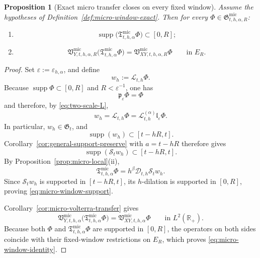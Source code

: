 \documentclass[11pt,a4paper]{amsart}
\theoremstyle{plain}
\newtheorem{proposition}[theorem]{Proposition}
\theoremstyle{definition}
\theoremstyle{remark}
\newcommand{\R}{\mathbb{R}}
\begin{document}
\begin{proposition}[Exact micro transfer closes on every fixed window]
\label{prop:micro-window-exact}
Assume the hypotheses of Definition~\ref{def:micro-window-exact}. Then for every
\(\Phi\in\mathfrak G_{t,h,\alpha,R}^{\mathrm{mic}}\):
\begin{enumerate}[label=(\roman*)]
\item
\begin{equation}\label{eq:micro-window-support}
\operatorname{supp}\bigl(\mathfrak T_{t,h,\alpha}^{\mathrm{mic}}\Phi\bigr)\subset [0,R];
\end{equation}
\item
\begin{equation}\label{eq:micro-window-identity}
\mathfrak V_{Y,t,h,\alpha,R}^{\mathrm{mic}}
\bigl(
\mathfrak T_{t,h,\alpha}^{\mathrm{mic}}\Phi
\bigr)
=
\mathfrak V_{XY,t,h,\alpha,R}^{\mathrm{mic}}\Phi
\qquad\text{in }E_R.
\end{equation}
\end{enumerate}
\end{proposition}

\begin{proof}
Set \(\varepsilon:=\varepsilon_{h,\alpha}\), and define
\[
w_h:=\mathcal L_{t,h}\Phi.
\]
Because \(\operatorname{supp}\Phi\subset [0,R]\) and \(R<\varepsilon^{-1}\), one has
\[
\mathfrak p_{\varepsilon}\Phi=\Phi
\]
and therefore, by \eqref{eq:two-scale-L},
\[
w_h
=
\mathcal L_{t,h}\Phi
=
\mathcal L_{t,h}^{(\alpha)}\mathfrak l_{\varepsilon}\Phi.
\]
In particular, \(w_h\in\mathfrak G_t\), and
\[
\operatorname{supp}(w_h)\subset [t-hR,t].
\]
Corollary~\ref{cor:general-support-preserve} with \(a=t-hR\) therefore gives
\[
\operatorname{supp}(\mathcal S_t w_h)\subset [t-hR,t].
\]
By Proposition~\ref{prop:micro-local}(ii),
\[
\mathfrak T_{t,h,\alpha}^{\mathrm{mic}}\Phi
=
h^\beta \mathcal D_{t,h}\mathcal S_t w_h.
\]
Since \(\mathcal S_t w_h\) is supported in \([t-hR,t]\), its \(h\)-dilation is supported in
\([0,R]\), proving \eqref{eq:micro-window-support}.

Corollary~\ref{cor:micro-volterra-transfer} gives
\[
\mathfrak V_{Y,t,h,\alpha}^{\mathrm{mic}}
\bigl(
\mathfrak T_{t,h,\alpha}^{\mathrm{mic}}\Phi
\bigr)
=
\mathfrak V_{XY,t,h,\alpha}^{\mathrm{mic}}\Phi
\qquad\text{in }L^2(\R_+).
\]
Because both \(\Phi\) and \(\mathfrak T_{t,h,\alpha}^{\mathrm{mic}}\Phi\) are supported in
\([0,R]\), the operators on both sides coincide with their fixed-window restrictions on \(E_R\),
which proves \eqref{eq:micro-window-identity}.
\end{proof}
\end{document}
